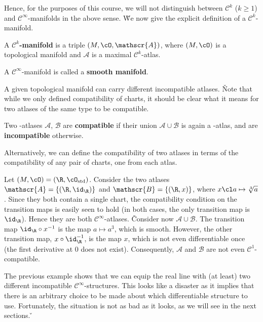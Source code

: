 Hence, for the purposes of this course, we will not distinguish between $\mathcal{C}^k$ ($k\geq 1$) and
$\mathcal{C}^\infty$-manifolds in the above sense. \v

We now give the explicit definition of a $\mathcal{C}^k$-manifold.

A $\mathcal{C}^k$\textbf{-manifold} is a triple $(M,\cO,\mathscr{A})$, where $(M,\cO)$ is a topological manifold and
$\mathscr{A}$ is a maximal $\mathcal{C}^k$-atlas.
\ed

A $\mathcal{C}^\infty$-manifold is called a \textbf{smooth manifold}.
\ed

A given topological manifold can carry different incompatible atlases. \v

Note that while we only defined compatibility of charts, it should be clear what it means for two atlases of the same
type to be compatible.

Two {\scalebox{0.75}\FiveFlowerOpen}-atlases $\mathscr{A}$, $\mathscr{B}$ are \textbf{compatible} if their union
$\mathscr{A}\cup\mathscr{B}$ is again a {\scalebox{0.75}\FiveFlowerOpen}-atlas, and are \textbf{incompatible} otherwise.
\ed

Alternatively, we can define the compatibility of two atlases in terms of the compatibility of any pair of charts,
one from each atlas.

\be
Let $(M,\cO)=(\R,\cO_\mathrm{std})$. Consider the two atlases $\mathscr{A}=\{(\R,\id_\R)\}$ and $\mathscr{B}=\{(\R,x)
\}$, where $x\cl a \mapsto \sqrt[3]{a}$. Since they both contain a single chart, the compatibility condition on the
transition maps is easily seen to hold (in both cases, the only transition map is $\id_\R$). Hence they are both
$\mathcal{C}^\infty$-atlases. \v

Consider now $\mathscr{A}\cup\mathscr{B}$. The transition map $\id_\R\circ x^{-1}$ is the map $a\mapsto a^3$, which
is smooth. However, the other transition map, $x\circ\id_\R^{-1}$, is the map $x$, which is not even differentiable
once (the first derivative at $0$ does not exist). Consequently, $\mathscr{A}$ and $\mathscr{B}$ are not even
$\mathcal{C}^1$-compatible.
\ee

The previous example shows that we can equip the real line with (at least) two different incompatible
$\mathcal{C}^\infty$-structures. This looks like a disaster as it implies that there is an arbitrary choice to be
made about which differentiable structure to use. Fortunately, the situation is not as bad as it looks, as we will
see in the next sections. \v

